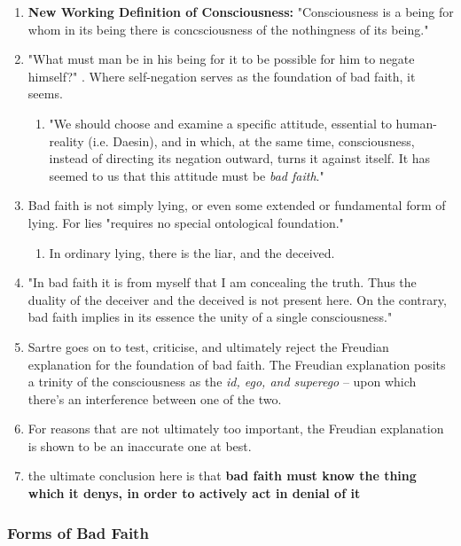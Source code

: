 \begin{enumerate}
  \item \textbf{New Working Definition of Consciousness:} "Consciousness is a being for whom in its being there is concsciousness of the nothingness of its being." \autocite[87]{sartre}
  \item "What must man be in  his being for it to be possible for him to negate himself?" \autocite[88]{sartre}. Where self-negation serves as the foundation of bad faith, it seems.
  \begin{enumerate}
    \item "We should choose and examine a specific attitude, essential to human-reality (i.e. Daesin), and in which, at the same time, consciousness, instead of directing its negation outward, turns it against itself. It has seemed to us that this attitude must be \emph{bad faith}." \autocite[88]{sartre}
  \end{enumerate}
  \item Bad faith is not simply lying, or even some extended or fundamental form of lying. For lies "requires no special ontological foundation." \autocite[89]{sartre}
  \begin{enumerate}
    \item In ordinary lying, there is the liar, and the deceived.
  \end{enumerate}
  \item "In bad faith it is from myself that I am concealing the truth. Thus the duality of the deceiver and the deceived is not present here. On the contrary, bad faith implies in its essence the unity of a single consciousness." \autocite[90]{sartre}
  \item Sartre goes on to test, criticise, and ultimately reject the Freudian explanation for the foundation of bad faith. The Freudian explanation posits a trinity of the consciousness as the \emph{id, ego, and superego} -- upon which there's an interference between one of the two.
  \item For reasons that are not ultimately too important, the Freudian explanation is shown to be an inaccurate one at best.
  \item the ultimate conclusion here is that \textbf{bad faith must know the thing which it denys, in order to actively act in denial of it}
\end{enumerate}

\subsubsection{Forms of Bad Faith}

